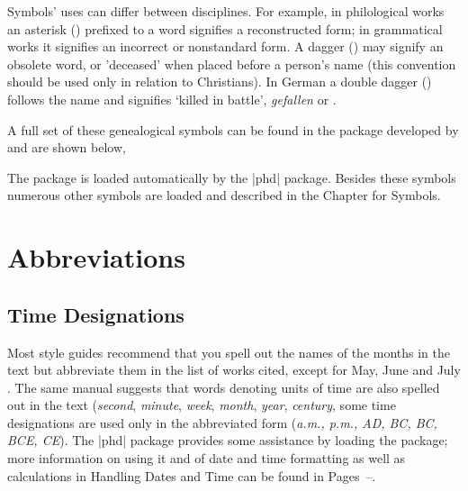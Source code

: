 Symbols' uses can differ between disciplines. For example, in philological
works an asterisk (\textasteriskcentered) prefixed to a word signifies a reconstructed
form; in grammatical works it signifies an incorrect or nonstandard
form. A dagger (\textdagger) may signify an obsolete word, or 'deceased' when
placed before a person's name (this convention should be used only in
relation to Christians). In German a double dagger (\textdaggerdbl) follows the name
and signifies `killed in battle', \emph{gefallen} or  \gtrsymKilled.

A full set of these genealogical symbols can be found in the  package  developed by   \citeyearpar{genealogytree} and are shown below,

\begin{scriptexample}[]{}{}
\textsl{\gtrSymbolsFullLegend[english]}
\end{scriptexample}

The package is loaded automatically by the |phd| package. Besides these symbols numerous other symbols
are loaded and described in the Chapter for Symbols.
\section{Abbreviations}

\subsection{Time Designations}

Most style guides recommend that you spell out the names of the months in the text but abbreviate them in the list  of works cited, except for May, June and July \cite{MLA}. The same manual suggests that words denoting units of time are also spelled out in the text (\textit{second}, \textit{minute}, \textit{week}, \textit{month}, \textit{year}, \textit{century}, some time designations are used only in the abbreviated form (\textit{a.m., p.m., AD, BC, BC, BCE, CE}). The |phd| package provides some assistance by loading the  package; more information on using it and of date and time formatting as well as calculations in Handling Dates and Time can be found in Pages~\pageref{ch:dates}--\pageref{datesend}.
\medskip

